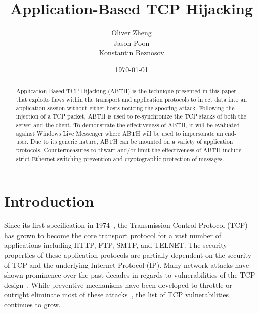 \documentclass{sig-alternate}
\begin{document}

\title{
Application-Based TCP Hijacking
}

\author {
	\alignauthor
	Oliver Zheng\\
	\alignauthor
	Jason Poon\\
	\alignauthor
	Konstantin Beznosov\\
}

\date{\today}

\maketitle

\begin{abstract}
Application-Based TCP Hijacking (ABTH) is the technique presented in this paper that exploits flaws within the transport and application protocols to inject data into an application session without either hosts noticing the spoofing attack.
Following the injection of a TCP packet, ABTH is used to re-synchronize the TCP stacks of both the server and the client.
To demonstrate the effectiveness of ABTH, it will be evaluated against Windows Live Messenger where ABTH will be used to impersonate an end-user.
Due to its generic nature, ABTH can be mounted on a variety of application protocols.
Countermeasures to thwart and/or limit the effectiveness of ABTH include strict Ethernet switching prevention and cryptographic protection of messages.
\end{abstract}



\section{Introduction}

Since its first specification in 1974~\cite{rfc:tcp}, the Transmission Control Protocol (TCP) has grown to become the core transport protocol for a vast number of applications including HTTP, FTP, SMTP, and TELNET.
The security properties of these application protocols are partially dependent on the security of TCP and the underlying Internet Protocol (IP).
Many network attacks have shown prominence over the past decades in regards to vulnerabilities of the TCP design~\cite{harris:tcpattacks}.
While preventive mechanisms have been developed to throttle or outright eliminate most of these attacks~\cite{dubrawsky:layer2}, the list of TCP vulnerabilities continues to grow.
\end{document}
